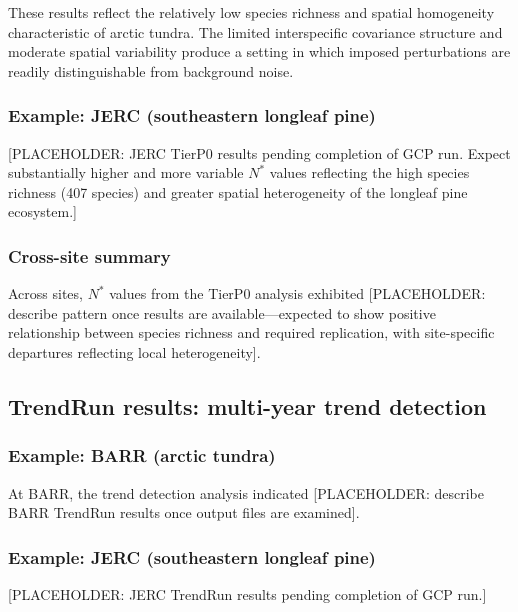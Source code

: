 \documentclass[
  11pt,
]{article}
\begin{document}
These results reflect the relatively low species richness and spatial
homogeneity characteristic of arctic tundra. The limited interspecific
covariance structure and moderate spatial variability produce a setting
in which imposed perturbations are readily distinguishable from
background noise.

\subsubsection{Example: JERC (southeastern longleaf
pine)}\label{example-jerc-southeastern-longleaf-pine}

{[}PLACEHOLDER: JERC TierP0 results pending completion of GCP run.
Expect substantially higher and more variable \(N^*\) values reflecting
the high species richness (407 species) and greater spatial
heterogeneity of the longleaf pine ecosystem.{]}

\subsubsection{Cross-site summary}\label{cross-site-summary}

Across sites, \(N^*\) values from the TierP0 analysis exhibited
{[}PLACEHOLDER: describe pattern once results are available---expected
to show positive relationship between species richness and required
replication, with site-specific departures reflecting local
heterogeneity{]}.

\subsection{TrendRun results: multi-year trend detection}

\subsubsection{Example: BARR (arctic
tundra)}\label{example-barr-arctic-tundra-1}

At BARR, the trend detection analysis indicated {[}PLACEHOLDER: describe
BARR TrendRun results once output files are examined{]}.

\subsubsection{Example: JERC (southeastern longleaf
pine)}\label{example-jerc-southeastern-longleaf-pine-1}

{[}PLACEHOLDER: JERC TrendRun results pending completion of GCP run.{]}
\end{document}
